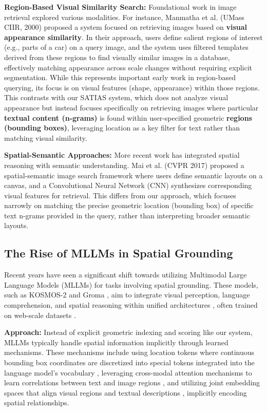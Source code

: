 \documentclass[sigconf,screen]{acmart}
\begin{document}
\textbf{Region-Based Visual Similarity Search:} Foundational work in image retrieval explored various modalities. For instance, Manmatha et al. (UMass CIIR, 2000) \cite{Manmatha00} proposed a system focused on retrieving images based on \textbf{visual appearance similarity}. In their approach, users define salient regions of interest (e.g., parts of a car) on a query image, and the system uses filtered templates derived from these regions to find visually similar images in a database, effectively matching appearance across scale changes without requiring explicit segmentation. While this represents important early work in region-based querying, its focus is on visual features (shape, appearance) within those regions. This contrasts with our SATIAS system, which does not analyze visual appearance but instead focuses specifically on retrieving images where particular \textbf{textual content (n-grams)} is found within user-specified geometric \textbf{regions (bounding boxes)}, leveraging location as a key filter for text rather than matching visual similarity.

\textbf{Spatial-Semantic Approaches:} More recent work has integrated spatial reasoning with semantic understanding. Mai et al. (CVPR 2017) \cite{Mai17} proposed a spatial-semantic image search framework where users define semantic layouts on a canvas, and a Convolutional Neural Network (CNN) synthesizes corresponding visual features for retrieval. This differs from our approach, which focuses narrowly on matching the precise geometric location (bounding box) of specific text n-grams provided in the query, rather than interpreting broader semantic layouts.

\subsection{The Rise of MLLMs in Spatial Grounding}

Recent years have seen a significant shift towards utilizing Multimodal Large Language Models (MLLMs) for tasks involving spatial grounding. These models, such as KOSMOS-2 \cite{Huang24} and Groma \cite{Yin24}, aim to integrate visual perception, language comprehension, and spatial reasoning within unified architectures \cite{Wang23UniIR}, often trained on web-scale datasets \cite{Huang24}.

\textbf{Approach:} Instead of explicit geometric indexing and scoring like our system, MLLMs typically handle spatial information implicitly through learned mechanisms. These mechanisms include using location tokens where continuous bounding box coordinates are discretized into special tokens integrated into the language model's vocabulary \cite{Huang24}, leveraging cross-modal attention mechanisms to learn correlations between text and image regions \cite{Tan23ESA}, and utilizing joint embedding spaces that align visual regions and textual descriptions \cite{Karpathy15}, implicitly encoding spatial relationships.
\end{document}
